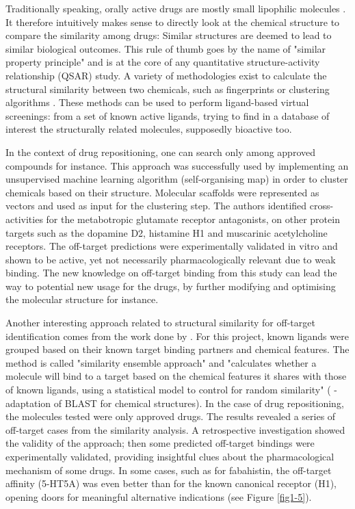Traditionally speaking, orally active drugs are mostly small lipophilic molecules \citep{lipinski1997experimental}. It therefore intuitively makes sense to directly look at the chemical structure to compare the similarity among drugs: Similar structures are deemed to lead to similar biological outcomes. This rule of thumb goes by the name of "similar property principle" \citep{johnson1990concepts} and is at the core of any quantitative structure-activity relationship (QSAR) study. A variety of methodologies exist to calculate the structural similarity between two chemicals, such as fingerprints or clustering algorithms \citep{eckert2007molecular}. These methods can be used to perform ligand-based virtual screenings: from a set of known active ligands, trying to find in a database of interest the structurally related molecules, supposedly bioactive too.

In the context of drug repositioning, one can search only among approved compounds for instance. This approach was successfully used by \cite{noeske2006predicting} implementing an unsupervised machine learning algorithm (self-organising map) in order to cluster chemicals based on their structure. Molecular scaffolds were represented as vectors and used as input for the clustering step. The authors identified cross-activities for the metabotropic glutamate receptor antagonists, on other protein targets such as the dopamine D2, histamine H1 and muscarinic acetylcholine receptors. The off-target predictions were experimentally validated in vitro and shown to be active, yet not necessarily pharmacologically relevant due to weak binding. The new knowledge on off-target binding from this study can lead the way to potential new usage for the drugs, by further modifying and optimising the molecular structure for instance.

Another interesting approach related to structural similarity for off-target identification comes from the work done by \citep{keiser2009predicting}. For this project, known ligands were grouped based on their known target binding partners and chemical features. The method is called "similarity ensemble approach" and "calculates whether a molecule will bind to a target based on the chemical features it shares with those of known ligands, using a statistical model to control for random similarity" (\cite{lounkine2012large} - adaptation of BLAST for chemical structures). In the case of drug repositioning, the molecules tested were only approved drugs. The results revealed a series of off-target cases from the similarity analysis. A retrospective investigation showed the validity of the approach; then some predicted off-target bindings were experimentally validated, providing insightful clues about the pharmacological mechanism of some drugs. In some cases, such as for fabahistin, the off-target affinity (5-HT5A) was even better than for the known canonical receptor (H1), opening doors for meaningful alternative indications (see Figure \ref{fig1-5}).

